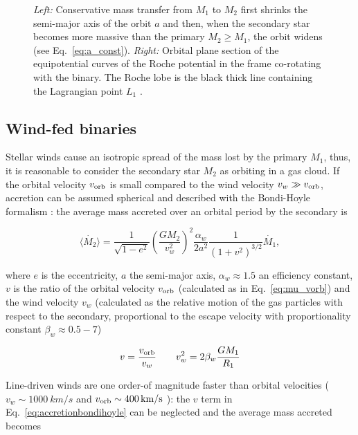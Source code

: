 \documentclass[a4paper,titlepage]{book}     	%
\begin{document}
\begin{figure}[h]
\begin{minipage}{.44\textwidth}
	\end{minipage}
	\caption{\emph{Left:} Conservative mass transfer from $M_1$ to $M_2$ first shrinks the semi-major axis of the orbit $a$ and then, when the secondary star becomes more massive than the primary $M_2 \geq M_1$, the orbit widens (see Eq.\ \ref{eq:a_const}). \emph{Right:} Orbital plane section of the equipotential curves of the Roche potential in the frame co-rotating with the binary. The Roche lobe is the black thick line containing the Lagrangian point $L_1$ \cite{tauris_evo_binaria}.}\label{fig:masstransferRochelobe}
\end{figure}

\subsection{Wind-fed binaries}\label{subsec:windfed}
Stellar winds cause an isotropic spread of the mass lost by the primary $M_1$, thus, it is reasonable to consider the secondary star $M_2$ as orbiting in a gas cloud. If the orbital velocity $v_{\rm orb}$ is small compared to the wind velocity $v_w \gg v_{\rm orb}$, accretion can be assumed spherical and described with the Bondi-Hoyle formalism \cite{BondiHoyle1944}: the average mass accreted over an orbital period by the secondary is

\begin{equation}\label{eq:accretionbondihoyle}
\langle \dot{M_2} \rangle = \frac{1}{\sqrt{1-e^2}} \left(\frac{G M_2}{v_w^2}\right)^2 \frac{\alpha_w}{2 a^2} \frac{1}{\left(1+v^2\right)^{3/2}} \dot{M_1},
\end{equation}

where $e$ is the eccentricity, $a$ the semi-major axis, $\alpha_w \approx 1.5$ an efficiency constant, $v$ is the ratio of the orbital velocity $v_{\rm orb}$ (calculated as in Eq.\ \ref{eq:mu_vorb}) and the wind velocity $v_w$ (calculated as the relative motion of the gas particles with respect to the secondary, proportional to the escape velocity with proportionality constant $\beta_w \approx 0.5-7$)

\begin{equation}
v = \frac{v_\textup{orb}}{v_w} \quad \quad v_w^2=2\beta_w \frac{G M_1}{R_1}
\end{equation}

Line-driven winds are one order-of magnitude faster than orbital velocities ($v_w \sim \SI{1000}{km/s}$ and $v_{\rm orb} \sim \SI{400}{km/s}$ \cite{CygX-3_Koljonen2017}): the $v$ term in Eq.\ \ref{eq:accretionbondihoyle} can be neglected and the average mass accreted becomes
\end{document}
